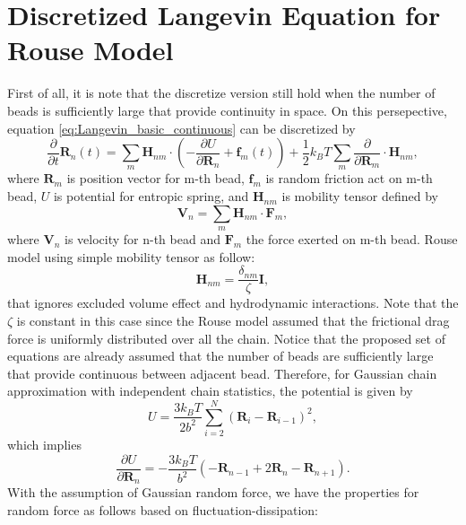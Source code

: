 \documentclass[10pt, a4paper]{article}
\begin{document}
\section{Discretized Langevin Equation for Rouse Model}
First of all, it is note that the discretize version still hold when the number of beads is sufficiently large that provide continuity in space. On this persepective, equation \eqref{eq:Langevin_basic_continuous} can be discretized by 
\begin{equation}
\frac{\partial }{\partial t}\mathbf{R}_n(t) = \sum_{m}\mathbf{H}_{nm}\cdot\left(-\frac{\partial U}{\partial \mathbf{R}_n} + \mathbf{f}_m(t)\right) + \frac{1}{2}k_BT\sum_{m}\frac{\partial}{\partial \mathbf{R}_m}\cdot\mathbf{H}_{nm},
\label{eq:Langevin_basic_discrete}
\end{equation}
where $\mathbf{R}_m$ is position vector for m-th bead, $\mathbf{f}_m$ is random friction act on m-th bead, $U$ is potential for entropic spring, and $\mathbf{H}_{nm}$ is mobility tensor defined by 
\begin{equation}
\mathbf{V}_n = \sum_{m}\mathbf{H}_{nm}\cdot\mathbf{F}_m,
\end{equation}
where $\mathbf{V}_n$ is velocity for n-th bead and $\mathbf{F}_m$ the force exerted on m-th bead.
Rouse model using simple mobility tensor as follow:
\begin{equation}
  \mathbf{H}_{nm} = \frac{\delta_{nm}}{\zeta}\mathbf{I},
\end{equation}
that ignores excluded volume effect and hydrodynamic interactions. Note that the $\zeta$ is constant in this case since the Rouse model assumed that the frictional drag force is uniformly distributed over all the chain.
Notice that the proposed set of equations are already assumed that the number of beads are sufficiently large that provide continuous between adjacent bead.
Therefore, for Gaussian chain approximation with independent chain statistics, the potential is given by
\begin{equation}
U = \frac{3k_BT}{2b^2}\sum_{i=2}^{N}\left(\mathbf{R}_i - \mathbf{R}_{i-1}\right)^2,
\end{equation}
which implies
\begin{equation}
\frac{\partial U}{\partial \mathbf{R}_n} = -\frac{3k_BT}{b^2}\left( -\mathbf{R}_{n-1} + 2\mathbf{R}_{n} - \mathbf{R}_{n+1} \right).
\label{eq:discretized_differentiation_U}
\end{equation}
With the assumption of Gaussian random force, we have the properties for random force as follows based on fluctuation-dissipation:
\end{document}
